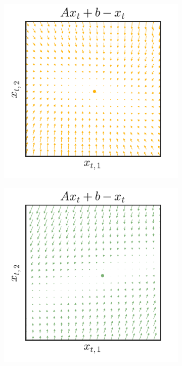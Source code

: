 \documentclass{article}
\begin{document}
\begin{figure}[t]
\begin{subfigure}{.24\textwidth}
\end{subfigure} 
\begin{subfigure}{.24\textwidth}
\includegraphics[width=\textwidth]{rotation_3}
\end{subfigure} 
\begin{subfigure}{.24\textwidth}
\includegraphics[width=\textwidth]{rotation_4}

\end{subfigure}
\end{figure}
\end{document}
